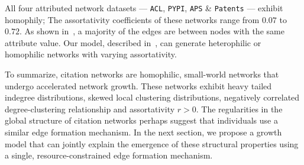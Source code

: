 All four attributed network datasets --- \texttt{ACL}, \texttt{PYPI}, \texttt{APS}
\& \texttt{Patents} --- exhibit homophily; The assortativity coefficients of
these networks range from $0.07$ to $0.72$. As shown in~,
a majority of the edges are between nodes with the same attribute value. Our model,
described in~, can generate heterophilic or homophilic
networks with varying assortativity.

To summarize, citation networks are homophilic, small-world networks that
undergo accelerated network growth. These networks exhibit heavy tailed indegree
distributions, skewed local clustering distributions, negatively correlated
degree-clustering relationship and assortativity $r > 0$. The regularities in
the  global structure of citation networks perhaps suggest that individuals use
a similar edge formation mechanism. In the next section, we propose a growth
model that can jointly explain the emergence of these structural properties
using a single, resource-constrained edge formation mechanism.




%

%

